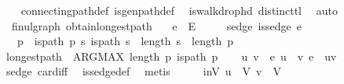 \begin{isabellebody}
\ \ %
\endisadelimproof
%
\isatagproof
{}\isamarkupfalse%
\ connecting{\isacharunderscore}{\kern0pt}path{\isacharunderscore}{\kern0pt}def\ is{\isacharunderscore}{\kern0pt}gen{\isacharunderscore}{\kern0pt}path{\isacharunderscore}{\kern0pt}def\ \isamarkupfalse%
\ is{\isacharunderscore}{\kern0pt}walk{\isacharunderscore}{\kern0pt}drop{\isacharunderscore}{\kern0pt}hd\ distinct{\isacharunderscore}{\kern0pt}tl\ \isamarkupfalse%
\ auto%
\endisatagproof
{\isafoldproof}%
%
\isadelimproof
\isanewline
%
\endisadelimproof
\isanewline
{}\isamarkupfalse%
\ {\isacharparenleft}{\kern0pt}\ fin{\isacharunderscore}{\kern0pt}ulgraph{\isacharparenright}{\kern0pt}\ obtain{\isacharunderscore}{\kern0pt}longest{\isacharunderscore}{\kern0pt}path{\isacharcolon}{\kern0pt}\isanewline
\ \ \ {\isachardoublequoteopen}e\ {\isasymin}\ E{\isachardoublequoteclose}\isanewline
\ \ \ \ \ sedge{\isacharcolon}{\kern0pt}\ {\isachardoublequoteopen}is{\isacharunderscore}{\kern0pt}sedge\ e{\isachardoublequoteclose}\isanewline
\ \ \ p\ \ {\isachardoublequoteopen}is{\isacharunderscore}{\kern0pt}path\ p{\isachardoublequoteclose}\ {\isachardoublequoteopen}{\isasymforall}s{\isachardot}{\kern0pt}\ is{\isacharunderscore}{\kern0pt}path\ s\ {\isasymlongrightarrow}\ length\ s\ {\isasymle}\ length\ p{\isachardoublequoteclose}\isanewline
%
\isadelimproof
%
\endisadelimproof
%
\isatagproof
{}\isamarkupfalse%
{\isacharminus}{\kern0pt}\isanewline
\ \ \isamarkupfalse%
\ {\isacharquery}{\kern0pt}longest{\isacharunderscore}{\kern0pt}path\ {\isacharequal}{\kern0pt}\ {\isachardoublequoteopen}ARG{\isacharunderscore}{\kern0pt}MAX\ length\ p{\isachardot}{\kern0pt}\ is{\isacharunderscore}{\kern0pt}path\ p{\isachardoublequoteclose}\isanewline
\ \ \isamarkupfalse%
\ u\ v\ \ e{\isacharcolon}{\kern0pt}\ {\isachardoublequoteopen}u\ {\isasymnoteq}\ v{\isachardoublequoteclose}\ {\isachardoublequoteopen}e\ {\isacharequal}{\kern0pt}\ {\isacharbraceleft}{\kern0pt}u{\isacharcomma}{\kern0pt}v{\isacharbraceright}{\kern0pt}{\isachardoublequoteclose}\ \isamarkupfalse%
\ sedge\ card{\isacharunderscore}{\kern0pt}{}{\isacharunderscore}{\kern0pt}iff\ \isamarkupfalse%
\ is{\isacharunderscore}{\kern0pt}sedge{\isacharunderscore}{\kern0pt}def\ \isamarkupfalse%
\ metis\isanewline
\ \ \isamarkupfalse%
\ \isamarkupfalse%
\ inV{\isacharcolon}{\kern0pt}\ {\isachardoublequoteopen}u\ {\isasymin}\ V{\isachardoublequoteclose}\ {\isachardoublequoteopen}v\ {\isasymin}\ V{\isachardoublequoteclose}\ \isamarkupfalse%

\end{isabellebody}

